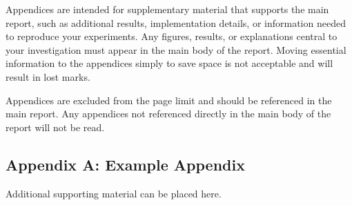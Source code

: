 \documentclass[letterpaper]{article}
\begin{document}
Appendices are intended for supplementary material that supports the main report, such as additional results, implementation details, or information needed to reproduce your experiments. Any figures, results, or explanations central to your investigation must appear in the main body of the report. Moving essential information to the appendices simply to save space is not acceptable and will result in lost marks.

Appendices are excluded from the page limit and should be referenced in the main report. Any appendices not referenced directly in the main body of the report will not be read.

\subsection*{Appendix A: Example Appendix}

Additional supporting material can be placed here.
\end{document}
